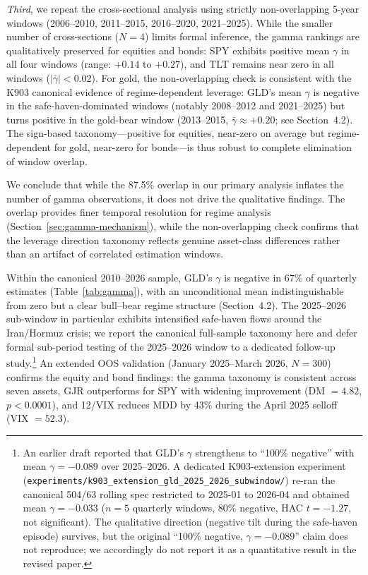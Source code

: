 \textit{Third}, we repeat the cross-sectional analysis using strictly non-overlapping 5-year windows (2006--2010, 2011--2015, 2016--2020, 2021--2025). While the smaller number of cross-sections ($N = 4$) limits formal inference, the gamma rankings are qualitatively preserved for equities and bonds: SPY exhibits positive mean $\gamma$ in all four windows (range: $+0.14$ to $+0.27$), and TLT remains near zero in all windows ($|\bar{\gamma}| < 0.02$). For gold, the non-overlapping check is consistent with the K903 canonical evidence of regime-dependent leverage: GLD's mean $\gamma$ is negative in the safe-haven-dominated windows (notably 2008--2012 and 2021--2025) but turns positive in the gold-bear window (2013--2015, $\bar{\gamma} \approx +0.20$; see Section~4.2). The sign-based taxonomy---positive for equities, near-zero on average but regime-dependent for gold, near-zero for bonds---is thus robust to complete elimination of window overlap.

We conclude that while the 87.5\% overlap in our primary analysis inflates the number of gamma observations, it does not drive the qualitative findings. The overlap provides finer temporal resolution for regime analysis (Section~\ref{sec:gamma-mechanism}), while the non-overlapping check confirms that the leverage direction taxonomy reflects genuine asset-class differences rather than an artifact of correlated estimation windows.

Within the canonical 2010--2026 sample, GLD's $\gamma$ is negative in 67\% of quarterly estimates (Table~\ref{tab:gamma}), with an unconditional mean indistinguishable from zero but a clear bull--bear regime structure (Section~4.2). The 2025--2026 sub-window in particular exhibits intensified safe-haven flows around the Iran/Hormuz crisis; we report the canonical full-sample taxonomy here and defer formal sub-period testing of the 2025--2026 window to a dedicated follow-up study.\footnote{An earlier draft reported that GLD's $\gamma$ strengthens to ``100\% negative'' with mean $\gamma = -0.089$ over 2025--2026. A dedicated K903-extension experiment (\texttt{experiments/k903\_extension\_gld\_2025\_2026\_subwindow/}) re-ran the canonical 504/63 rolling spec restricted to 2025-01 to 2026-04 and obtained mean $\gamma = -0.033$ ($n = 5$ quarterly windows, 80\% negative, HAC $t = -1.27$, not significant). The qualitative direction (negative tilt during the safe-haven episode) survives, but the original ``100\% negative, $\gamma = -0.089$'' claim does not reproduce; we accordingly do not report it as a quantitative result in the revised paper.} An extended OOS validation (January 2025--March 2026, $N = 300$) confirms the equity and bond findings: the gamma taxonomy is consistent across seven assets, GJR outperforms for SPY with widening improvement (DM $= 4.82$, $p < 0.0001$), and 12/VIX reduces MDD by 43\% during the April 2025 selloff (VIX $= 52.3$).

